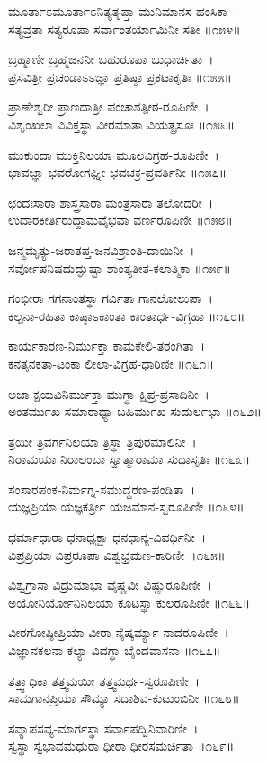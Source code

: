 ಮೂರ್ತಾಽಮೂರ್ತಾಽನಿತ್ಯತೃಪ್ತಾ ಮುನಿಮಾನಸ-ಹಂಸಿಕಾ~।\\
ಸತ್ಯವ್ರತಾ ಸತ್ಯರೂಪಾ ಸರ್ವಾಂತರ್ಯಾಮಿನೀ ಸತೀ ॥೧೫೪॥

ಬ್ರಹ್ಮಾಣೀ ಬ್ರಹ್ಮಜನನೀ ಬಹುರೂಪಾ ಬುಧಾರ್ಚಿತಾ~।\\
ಪ್ರಸವಿತ್ರೀ ಪ್ರಚಂಡಾಽಽಜ್ಞಾ ಪ್ರತಿಷ್ಠಾ ಪ್ರಕಟಾಕೃತಿಃ ॥೧೫೫॥

ಪ್ರಾಣೇಶ್ವರೀ ಪ್ರಾಣದಾತ್ರೀ ಪಂಚಾಶತ್ಪೀಠ-ರೂಪಿಣೀ~।\\
ವಿಶೃಂಖಲಾ ವಿವಿಕ್ತಸ್ಥಾ ವೀರಮಾತಾ ವಿಯತ್ಪ್ರಸೂಃ ॥೧೫೬॥

ಮುಕುಂದಾ ಮುಕ್ತಿನಿಲಯಾ ಮೂಲವಿಗ್ರಹ-ರೂಪಿಣೀ~।\\
ಭಾವಜ್ಞಾ ಭವರೋಗಘ್ನೀ ಭವಚಕ್ರ-ಪ್ರವರ್ತಿನೀ ॥೧೫೭॥

ಛಂದಃಸಾರಾ ಶಾಸ್ತ್ರಸಾರಾ ಮಂತ್ರಸಾರಾ ತಲೋದರೀ~।\\
ಉದಾರಕೀರ್ತಿರುದ್ದಾಮವೈಭವಾ ವರ್ಣರೂಪಿಣೀ ॥೧೫೮॥

ಜನ್ಮಮೃತ್ಯು-ಜರಾತಪ್ತ-ಜನವಿಶ್ರಾಂತಿ-ದಾಯಿನೀ~।\\
ಸರ್ವೋಪನಿಷದುದ್ಘುಷ್ಟಾ ಶಾಂತ್ಯತೀತ-ಕಲಾತ್ಮಿಕಾ ॥೧೫೯॥

ಗಂಭೀರಾ ಗಗನಾಂತಸ್ಥಾ ಗರ್ವಿತಾ ಗಾನಲೋಲುಪಾ~।\\
ಕಲ್ಪನಾ-ರಹಿತಾ ಕಾಷ್ಠಾಽಕಾಂತಾ ಕಾಂತಾರ್ಧ-ವಿಗ್ರಹಾ ॥೧೬೦॥

ಕಾರ್ಯಕಾರಣ-ನಿರ್ಮುಕ್ತಾ ಕಾಮಕೇಲಿ-ತರಂಗಿತಾ~।\\
ಕನತ್ಕನಕತಾ-ಟಂಕಾ ಲೀಲಾ-ವಿಗ್ರಹ-ಧಾರಿಣೀ ॥೧೬೧॥

ಅಜಾ ಕ್ಷಯವಿನಿರ್ಮುಕ್ತಾ ಮುಗ್ಧಾ ಕ್ಷಿಪ್ರ-ಪ್ರಸಾದಿನೀ~।\\
ಅಂತರ್ಮುಖ-ಸಮಾರಾಧ್ಯಾ ಬಹಿರ್ಮುಖ-ಸುದುರ್ಲಭಾ ॥೧೬೨॥

ತ್ರಯೀ ತ್ರಿವರ್ಗನಿಲಯಾ ತ್ರಿಸ್ಥಾ ತ್ರಿಪುರಮಾಲಿನೀ~।\\
ನಿರಾಮಯಾ ನಿರಾಲಂಬಾ ಸ್ವಾತ್ಮಾರಾಮಾ ಸುಧಾಸೃತಿಃ ॥೧೬೩॥

ಸಂಸಾರಪಂಕ-ನಿರ್ಮಗ್ನ-ಸಮುದ್ಧರಣ-ಪಂಡಿತಾ~।\\
ಯಜ್ಞಪ್ರಿಯಾ ಯಜ್ಞಕರ್ತ್ರೀ ಯಜಮಾನ-ಸ್ವರೂಪಿಣೀ ॥೧೬೪॥

ಧರ್ಮಾಧಾರಾ ಧನಾಧ್ಯಕ್ಷಾ ಧನಧಾನ್ಯ-ವಿವರ್ಧಿನೀ~।\\
ವಿಪ್ರಪ್ರಿಯಾ ವಿಪ್ರರೂಪಾ ವಿಶ್ವಭ್ರಮಣ-ಕಾರಿಣೀ ॥೧೬೫॥

ವಿಶ್ವಗ್ರಾಸಾ ವಿದ್ರುಮಾಭಾ ವೈಷ್ಣವೀ ವಿಷ್ಣುರೂಪಿಣೀ~।\\
ಅಯೋನಿರ್ಯೋನಿನಿಲಯಾ ಕೂಟಸ್ಥಾ ಕುಲರೂಪಿಣೀ ॥೧೬೬॥

ವೀರಗೋಷ್ಠೀಪ್ರಿಯಾ ವೀರಾ ನೈಷ್ಕರ್ಮ್ಯಾ  ನಾದರೂಪಿಣೀ~।\\
ವಿಜ್ಞಾನಕಲನಾ ಕಲ್ಯಾ ವಿದಗ್ಧಾ ಬೈಂದವಾಸನಾ ॥೧೬೭॥

ತತ್ತ್ವಾಧಿಕಾ ತತ್ತ್ವಮಯೀ ತತ್ತ್ವಮರ್ಥ-ಸ್ವರೂಪಿಣೀ~।\\
ಸಾಮಗಾನಪ್ರಿಯಾ ಸೌಮ್ಯಾ ಸದಾಶಿವ-ಕುಟುಂಬಿನೀ ॥೧೬೮॥

ಸವ್ಯಾಪಸವ್ಯ-ಮಾರ್ಗಸ್ಥಾ ಸರ್ವಾಪದ್ವಿನಿವಾರಿಣೀ~।\\
ಸ್ವಸ್ಥಾ ಸ್ವಭಾವಮಧುರಾ ಧೀರಾ ಧೀರಸಮರ್ಚಿತಾ ॥೧೬೯॥

